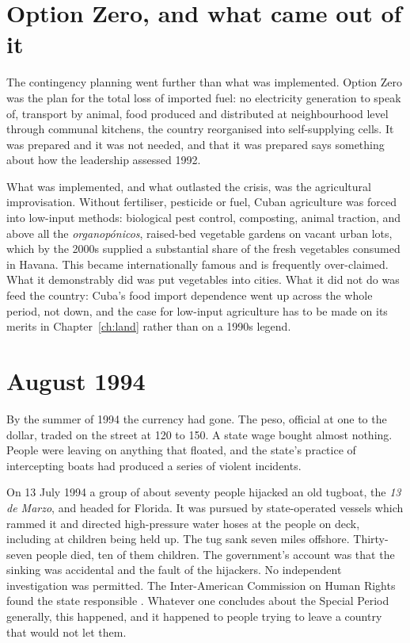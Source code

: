 \section{Option Zero, and what came out of it}

The contingency planning went further than what was implemented. Option Zero was
the plan for the total loss of imported fuel: no electricity generation to
speak of, transport by animal, food produced and distributed at neighbourhood
level through communal kitchens, the country reorganised into self-supplying
cells. It was prepared and it was not needed, and that it was prepared says
something about how the leadership assessed 1992.

What was implemented, and what outlasted the crisis, was the agricultural
improvisation. Without fertiliser, pesticide or fuel, Cuban agriculture was
forced into low-input methods: biological pest control, composting, animal
traction, and above all the \emph{organop\'onicos}, raised-bed vegetable
gardens on vacant urban lots, which by the 2000s supplied a substantial share
of the fresh vegetables consumed in Havana. This became internationally famous
and is frequently over-claimed. What it demonstrably did was put vegetables into
cities. What it did not do was feed the country: Cuba's food import dependence
went up across the whole period, not down, and the case for low-input
agriculture has to be made on its merits in Chapter~\ref{ch:land} rather than
on a 1990s legend.

\section{August 1994}

By the summer of 1994 the currency had gone. The peso, official at one to the
dollar, traded on the street at 120 to 150. A state wage bought almost nothing.
People were leaving on anything that floated, and the state's practice of
intercepting boats had produced a series of violent incidents.

On 13 July 1994 a group of about seventy people hijacked an old tugboat, the
\emph{13 de Marzo}, and headed for Florida. It was pursued by state-operated
vessels which rammed it and directed high-pressure water hoses at the people on
deck, including at children being held up. The tug sank seven miles offshore.
Thirty-seven people died, ten of them children.\unv{} The government's account
was that the sinking was accidental and the fault of the hijackers. No
independent investigation was permitted. The Inter-American Commission on Human
Rights found the state responsible \citep{iachr1996}. Whatever one concludes about the Special
Period generally, this happened, and it happened to people trying to leave a
country that would not let them.

